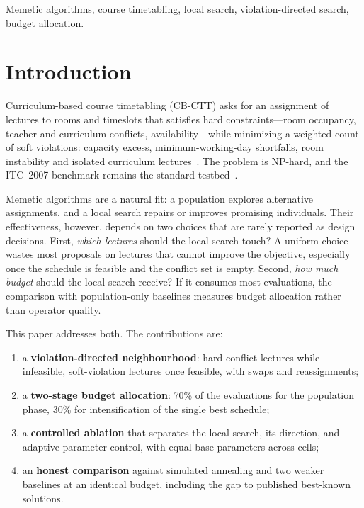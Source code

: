 \documentclass[journal]{IEEEtran}
\begin{document}
\begin{IEEEkeywords}
Memetic algorithms, course timetabling, local search, violation-directed search, budget allocation.
\end{IEEEkeywords}

\section{Introduction}
Curriculum-based course timetabling (CB-CTT) asks for an assignment of lectures to rooms and timeslots that satisfies hard constraints---room occupancy, teacher and curriculum conflicts, availability---while minimizing a weighted count of soft violations: capacity excess, minimum-working-day shortfalls, room instability and isolated curriculum lectures~\cite{mccollum2009setting}. The problem is NP-hard, and the ITC~2007 benchmark remains the standard testbed~\cite{bonutti2012benchmarking,ceschia2022educational}.

Memetic algorithms are a natural fit: a population explores alternative assignments, and a local search repairs or improves promising individuals. Their effectiveness, however, depends on two choices that are rarely reported as design decisions. First, \emph{which lectures} should the local search touch? A uniform choice wastes most proposals on lectures that cannot improve the objective, especially once the schedule is feasible and the conflict set is empty. Second, \emph{how much budget} should the local search receive? If it consumes most evaluations, the comparison with population-only baselines measures budget allocation rather than operator quality.

This paper addresses both. The contributions are:
\begin{enumerate}
    \item a \textbf{violation-directed neighbourhood}: hard-conflict lectures while infeasible, soft-violation lectures once feasible, with swaps and reassignments;
    \item a \textbf{two-stage budget allocation}: 70\% of the evaluations for the population phase, 30\% for intensification of the single best schedule;
    \item a \textbf{controlled ablation} that separates the local search, its direction, and adaptive parameter control, with equal base parameters across cells;
    \item an \textbf{honest comparison} against simulated annealing and two weaker baselines at an identical budget, including the gap to published best-known solutions.
\end{enumerate}
\end{document}

